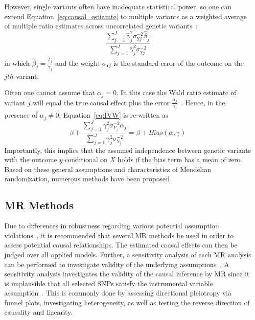 However, single variants often have inadequate statistical power, so one can extend Equation~\ref{eq:causal_estiamte} to multiple variants as a weighted average of multiple ratio estimates across uncorrelated genetic variants~\cite{Bowden2015}:
\begin{equation} \label{eq:IVW}
  \frac{\sum^J_{j=1} \hat{\gamma}_j^2\sigma_{Yj}^{-2} \hat{\beta}_j}
  {\sum^J_{j=1} \hat{\gamma}_j^2\sigma_{Yj}^{-2}}
\end{equation}
in which $\hat{\beta}_j = \frac{\hat{\Gamma}_j}{\hat{\gamma}_j}$ and the weight $\sigma_{Yj}$ is the standard error of the outcome on the $jth$ variant.

Often one cannot assume that $\alpha_j = 0$.
In this case the Wald ratio estimate of variant $j$ will equal the true causal effect plus the error $\frac{\alpha_j}{\gamma_j}$~\cite{Bowden2015}. 
Hence, in the presence of $\alpha_j \neq 0$, Equation~\ref{eq:IVW} is re-written as
\begin{equation} \label{eq:TSLSbias}
  \beta + \frac{\sum^J_{j=1} \gamma_j^2\sigma_{Y_j}^{-2} \alpha_j}
  {\sum^J_{j=1} \gamma_j^2\sigma_{Y_j}^{-2}} = \beta + Bias(\alpha, \gamma)
\end{equation}
Importantly, this implies that the assumed independence between genetic variants with the outcome $y$ conditional on $X$ holds if the bias term has a mean of zero.
Based on these general assumptions and characteristics of Mendelian randomization, numerous methods have been proposed.

\subsection{MR Methods}
\label{sub:Used_Methods}

Due to differences in robustness regarding various potential assumption violations~\citet{Burgess2016}, it is recommended that several MR methods be used in order to assess potential causal relationships.
The estimated causal effects can then be judged over all  applied models.
Further, a sensitivity analysis of each MR analysis can be performed to investigate validity of the underlying assumptions~\cite{Burgess2016}.
A sensitivity analysis investigates the validity of the causal inference by MR since it is implausible that all selected SNPs satisfy the instrumental variable assumption~\cite{Burgess2016}.
This is commonly done by assessing directional pleiotropy via funnel plots, investigating heterogeneity, as well as testing the reverse direction of causality and linearity.

